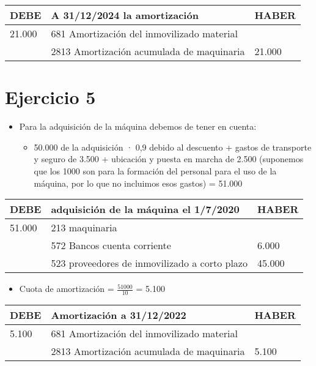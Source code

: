 \documentclass[a4paper,12pt]{article}
\newcommand{\fec}{31/12/}
\newcommand{\AIM}{681 Amortización del inmovilizado material }
\newcommand{\AAMAQ}{2813 Amortización acumulada de maquinaria }
\newcommand{\bancos}{572 Bancos cuenta corriente}
\newcommand{\cuotaamort}{Cuota de amortización = }
\begin{document}
\begin{table}[H]
    \centering
    \begin{tabular}{|p{3cm}|p{6cm}|p{3cm}|}
    \hline
    \textbf{DEBE} & \textbf{ A \fec2024 la amortización} & \textbf{HABER} \\
    \hline
    21.000 & \AIM & \\
    \hline
    & \AAMAQ & 21.000\\
    \hline
    \end{tabular}
\end{table}

\section{Ejercicio 5}

\begin{itemize}
    \item Para la adquisición de la máquina debemos de tener en cuenta:
    \begin{itemize}
        \item 50.000 de la adquisición · 0,9 debido al descuento + gastos de transporte y seguro de 3.500 + ubicación y puesta en marcha de 2.500 (suponemos que los 1000 son para la formación del personal para el uso de la máquina, por lo que no incluimos esos gastos) = 51.000
    \end{itemize}
\end{itemize}
\begin{table}[H]
    \centering
    \begin{tabular}{|p{3cm}|p{6cm}|p{3cm}|}
    \hline
    \textbf{DEBE} & \textbf{adquisición de la máquina el 1/7/2020} & \textbf{HABER} \\
    \hline
    51.000& 213 maquinaria& \\
    \hline
    & \bancos & 6.000\\
    \hline
    & 523 proveedores de inmovilizado a corto plazo& 45.000\\
    \hline
    \end{tabular}
\end{table}

\begin{itemize}
    \item \cuotaamort $\frac{51000}{10}$ = 5.100
\end{itemize}

\begin{table}[H]
    \centering
    \begin{tabular}{|p{3cm}|p{6cm}|p{3cm}|}
    \hline
    \textbf{DEBE} & \textbf{Amortización a \fec2022} & \textbf{HABER} \\
    \hline
    5.100& \AIM & \\
    \hline
    & \AAMAQ & 5.100\\
    \hline
    \end{tabular}
\end{table}
\end{document}
